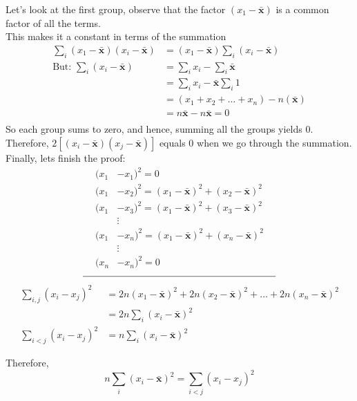\documentclass[12pt, fleqn]{article}
\begin{document}
Let's look at the first group, observe that the factor $(x_1 - \bm\bar{x})$ is a common factor of all the terms. \\
This makes it a constant in terms of the summation
\begin{align*}
\sum_{i}(x_1 - \bm\bar{x})(x_i - \bm\bar{x}) &= (x_1 - \bm\bar{x})\sum_{i}(x_i - \bm\bar{x}) \\
\mbox{But:  } \sum_{i}(x_i - \bm\bar{x}) &= \sum_{i}x_i - \sum_{i}\bm\bar{x} \\
&= \sum_{i}x_i - \bm\bar{x}\sum_{i}1 \\
&= (x_1 + x_2 + \ldots + x_n) - n(\bm\bar{x}) \\
&= n\bm\bar{x} - n\bm\bar{x} = 0 \\
\end{align*}
So each group sums to zero, and hence, summing all the groups yields 0. \\
Therefore, $2[(x_i - \bm\bar{x})(x_j - \bm\bar{x})]$ equals 0 when we go through the summation. \\

Finally, lets finish the proof:
\begin{align*}
(x_1 &- x_1)^2 = 0 \\
(x_1 &- x_2)^2 =  (x_1 - \bm\bar{x})^2 + (x_2 - \bm\bar{x})^2 \\
(x_1 &- x_3)^2 =  (x_1 - \bm\bar{x})^2 + (x_3 - \bm\bar{x})^2 \\
&\vdots \\
(x_1 &- x_n)^2 = (x_1 - \bm\bar{x})^2 + (x_n - \bm\bar{x})^2 \\
&\vdots \\
(x_n &- x_n)^2 = 0 
\end{align*}
\[\line(1, 0) {200}\]
\begin{align*}
\sum_{i, j} (x_i - x_j)^2 &= 2n(x_1 - \bm\bar{x})^2 + 2n(x_2 - \bm\bar{x})^2 + \ldots + 2n(x_n - \bm\bar{x})^2 \\
&= 2n\sum_{i}(x_i - \bm\bar{x})^2 \\
\sum_{i<j} (x_i - x_j)^2 &= n\sum_{i}(x_i - \bm\bar{x})^2
\end{align*}

Therefore, \[n \sum_{i}(x_i - \bm\bar{x})^2 = \sum_{i<j} (x_i - x_j)^2\]
\end{document}

